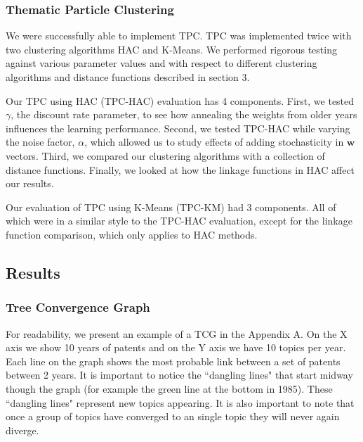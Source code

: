 \documentclass[conference]{IEEEtran}
\begin{document}
\subsubsection{Thematic Particle Clustering}
We were successfully able to implement TPC. TPC was implemented twice with two clustering algorithms HAC and K-Means. We performed rigorous testing against various parameter values and with respect to different clustering algorithms and distance functions described in section 3.

Our TPC using HAC (TPC-HAC) evaluation has 4 components. First, we tested $\gamma$, the discount rate parameter, to see how annealing the weights from older years influences the learning performance. Second, we tested TPC-HAC while varying the noise factor, $\alpha$, which allowed us to study effects of adding stochasticity in $\mathbf{w}$ vectors. Third, we compared our clustering algorithms with a collection of distance functions. Finally, we looked at how the linkage functions in HAC affect our results.

Our evaluation of TPC using K-Means (TPC-KM) had 3 components. All of which were in a similar style to the TPC-HAC evaluation, except for the linkage function comparison, which only applies to HAC methods.

\subsection{Results}

\subsubsection{Tree Convergence Graph}
For readability, we  present an example of a TCG in the Appendix A. On the X axis we show 10 years of patents and on the Y axis we have 10 topics per year. Each line on the graph shows the most probable link between a set of patents between 2 years. It is important to notice the ``dangling lines" that start midway though the graph (for example the green line at the bottom in 1985). These ``dangling lines" represent new topics appearing. It is also important to note that once a group of topics have converged to an single topic they will never again diverge. 
\end{document}
